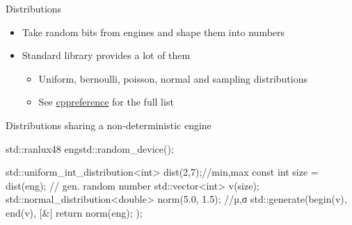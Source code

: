 \begin{frame}[fragile]
  \begin{block}{Distributions}
    \begin{itemize}
      \item Take random bits from engines and shape them into numbers
      \item Standard library provides a lot of them
      \begin{itemize}
        \item Uniform, bernoulli, poisson, normal and sampling distributions
        \item See \href{https://en.cppreference.com/w/cpp/numeric/random}{cppreference} for the full list
      \end{itemize}
    \end{itemize}
  \end{block}
  \begin{exampleblock}{Distributions sharing a non-deterministic engine}
    \begin{cppcode*}{}
      std::ranlux48 eng{std::random_device{}()};

      std::uniform_int_distribution<int> dist(2,7);//min,max
      const int size = dist(eng); // gen. random number
      std::vector<int> v(size);
      std::normal_distribution<double> norm(5.0, 1.5); //µ,σ
      std::generate(begin(v), end(v),
                    [&]{ return norm(eng); });
    \end{cppcode*}
  \end{exampleblock}
\end{frame}

